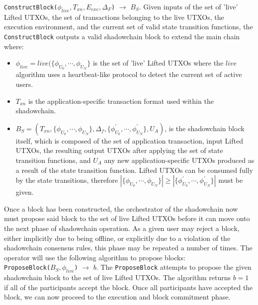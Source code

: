 \documentclass[10pt,a4paper]{article}
\theoremstyle{definition}
\begin{document}
\texttt{ConstructBlock($\phi_{live}, T_{xn}, E_{exe}, \Delta_F$)} $\rightarrow$
$B_S$. Given inputs of the set of 'live' Lifted UTXOs, the set of transactions
belonging to the live UTXOs, the execution environment, and the current set of
valid state transition functions, the \texttt{ConstructBlock} outputs a valid
shadowchain block to extend the main chain where: 
\begin{itemize}
    \item $\phi_{live} = live(\{\phi_{U_0}, \cdots, \phi_{U_N}\}$ is the set of
        'live' Lifted UTXOs where the $live$ algorithm uses a heartbeat-like
        protocol to detect the current set of active users.

    \item $T_{xn}$ is the application-specific transaction format used within
        the shadowchain.

    \item $B_S = (T_{xn}, \{\phi_{U_0}, \cdots, \phi_{U_N}\}, \Delta_{f},
        \{\phi_{U_0}^\prime, \cdots, \phi_{U_N}^\prime\}, U_{A})$, is the
        shadowchain block itself, which is composed of the set of application
        transaction, input Lifted UTXOs, the resulting output UTXOs after
        applying the set of state transition functions, and $U_{A}$ any new
        application-specific UTXOs produced as a result of the state transition
        function. Lifted UTXOs can be consumed fully by the state transitions,
        therefore $|\{\phi_{U_0}, \cdots, \phi_{U_N}\}| \geq
        |\{\phi_{U_0}^\prime, \cdots, \phi_{U_N}^\prime\}|$ must be given.
\end{itemize}

Once a block has been constructed, the orchestrator of the shadowchain now must
propose said block to the set of live Lifted UTXOs before it can move onto the
next phase of shadowchain operation. As a given user may reject a block, either
implicitly due to being offline, or explicitly due to a violation of the
shadowchain consensus rules, this phase may be repeated a number of times.  The
operator will use the following algorithm to propose blocks: \\

\texttt{ProposeBlock($B_S, \phi_{live}$)} $\rightarrow$ $b$. The
\texttt{ProposeBlock} attempts to propose the given shadowchain block to the
set of live Lifted UTXOs. The algorithm returns $b=1$ if all of the
participants accept the block. Once all participants have accepted the block,
we can now proceed to the execution and block commitment phase.
\end{document}
